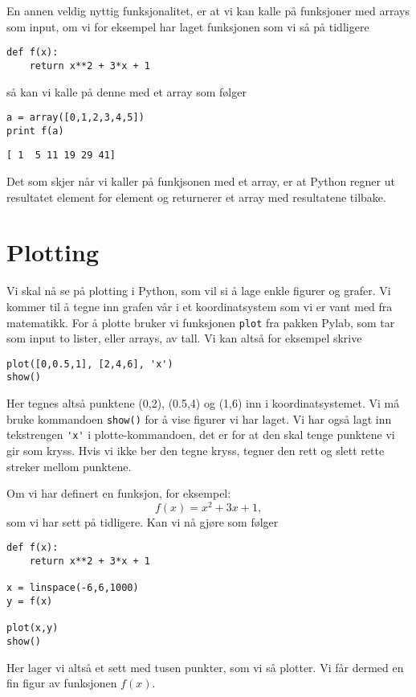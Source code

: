 \documentclass[a4paper, 11pt, notitlepage, english]{article}
\begin{document}
En annen veldig nyttig funksjonalitet, er at vi kan kalle på funksjoner med arrays som input, om vi for eksempel har laget funksjonen som vi så på tidligere
\begin{lstlisting}
def f(x):
    return x**2 + 3*x + 1
\end{lstlisting}
\vspace{-0.3cm}
så kan vi kalle på denne med et array som følger
\begin{lstlisting}
a = array([0,1,2,3,4,5])
print f(a)
\end{lstlisting}
\vspace{-0.3cm}
\begin{lstlisting}
[ 1  5 11 19 29 41]
\end{lstlisting}
\vspace{-0.3cm}
Det som skjer når vi kaller på funkjsonen med et array, er at Python regner ut resultatet element for element og returnerer et array med resultatene tilbake.

\section{Plotting}
Vi skal nå se på plotting i Python, som vil si å lage enkle figurer og grafer. Vi kommer til å tegne inn grafen vår i et koordinatsystem som vi er vant med fra matematikk. For å plotte bruker vi funksjonen \verb+plot+ fra pakken Pylab, som tar som input to lister, eller arrays, av tall. Vi kan altså for eksempel skrive
\begin{lstlisting}
plot([0,0.5,1], [2,4,6], 'x')
show()
\end{lstlisting}
\vspace{-0.3cm}
Her tegnes altså punktene (0,2), (0.5,4) og (1,6) inn i koordinatsystemet.
Vi må bruke kommandoen \verb+show()+ for å vise figurer vi har laget. Vi har også lagt inn tekstrengen \verb+'x'+ i plotte-kommandoen, det er for at den skal tenge punktene vi gir som kryss. Hvis vi ikke ber den tegne kryss, tegner den rett og slett rette streker mellom punktene.

Om vi har definert en funksjon, for eksempel:
$$f(x) = x^2 + 3x + 1,$$
som vi har sett på tidligere. Kan vi nå gjøre som følger
\begin{lstlisting}
def f(x):
    return x**2 + 3*x + 1

x = linspace(-6,6,1000)
y = f(x)

plot(x,y)
show()
\end{lstlisting}
\vspace{-0.3cm}
Her lager vi altså et sett med tusen punkter, som vi så plotter. Vi får dermed en fin figur av funksjonen $f(x)$. 
\end{document}
